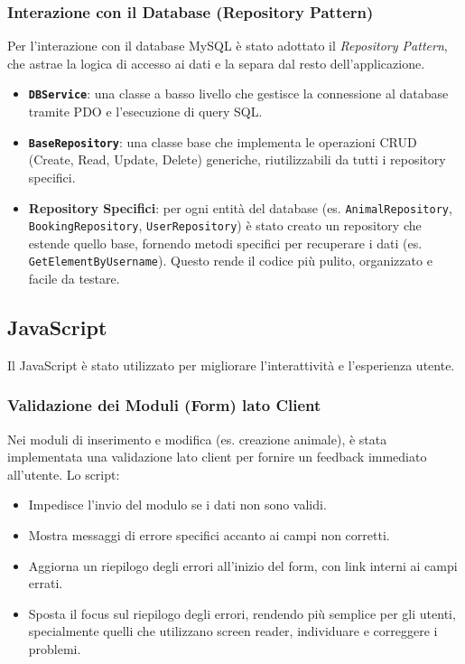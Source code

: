 \subsubsection{Interazione con il Database (Repository Pattern)}
Per l'interazione con il database MySQL è stato adottato il \textit{Repository Pattern}, che astrae la logica di accesso ai dati e la separa dal resto dell'applicazione.
\begin{itemize}
    \item \textbf{\texttt{DBService}}: una classe a basso livello che gestisce la connessione al database tramite PDO e l'esecuzione di query SQL.
    \item \textbf{\texttt{BaseRepository}}: una classe base che implementa le operazioni CRUD (Create, Read, Update, Delete) generiche, riutilizzabili da tutti i repository specifici.
    \item \textbf{Repository Specifici}: per ogni entità del database (es. \texttt{AnimalRepository}, \texttt{BookingRepository}, \texttt{UserRepository}) è stato creato un repository che estende quello base, fornendo metodi specifici per recuperare i dati (es. \texttt{GetElementByUsername}). Questo rende il codice più pulito, organizzato e facile da testare.
\end{itemize}

\subsection{JavaScript}
Il JavaScript è stato utilizzato per migliorare l'interattività e l'esperienza utente.
\subsubsection{Validazione dei Moduli (Form) lato Client}
Nei moduli di inserimento e modifica (es. creazione animale), è stata implementata una validazione lato client per fornire un feedback immediato all'utente. Lo script:
\begin{itemize}
    \item Impedisce l'invio del modulo se i dati non sono validi.
    \item Mostra messaggi di errore specifici accanto ai campi non corretti.
    \item Aggiorna un riepilogo degli errori all'inizio del form, con link interni ai campi errati.
    \item Sposta il focus sul riepilogo degli errori, rendendo più semplice per gli utenti, specialmente quelli che utilizzano screen reader, individuare e correggere i problemi.
\end{itemize}

